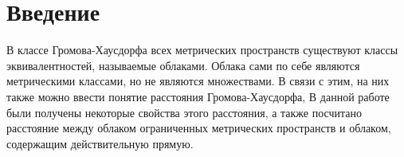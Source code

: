\section*{Введение}  
В классе Громова-Хаусдорфа всех метрических пространств существуют классы
эквивалентностей, называемые облаками. Облака сами по себе являются метрическими
классами, но не являются множествами. В связи с этим, на них также можно ввести
понятие расстояния Громова-Хаусдорфа, В данной работе были получены некоторые
свойства этого расстояния, а также посчитано расстояние между облаком
ограниченных метрических пространств и облаком, содержащим действительную
прямую.
